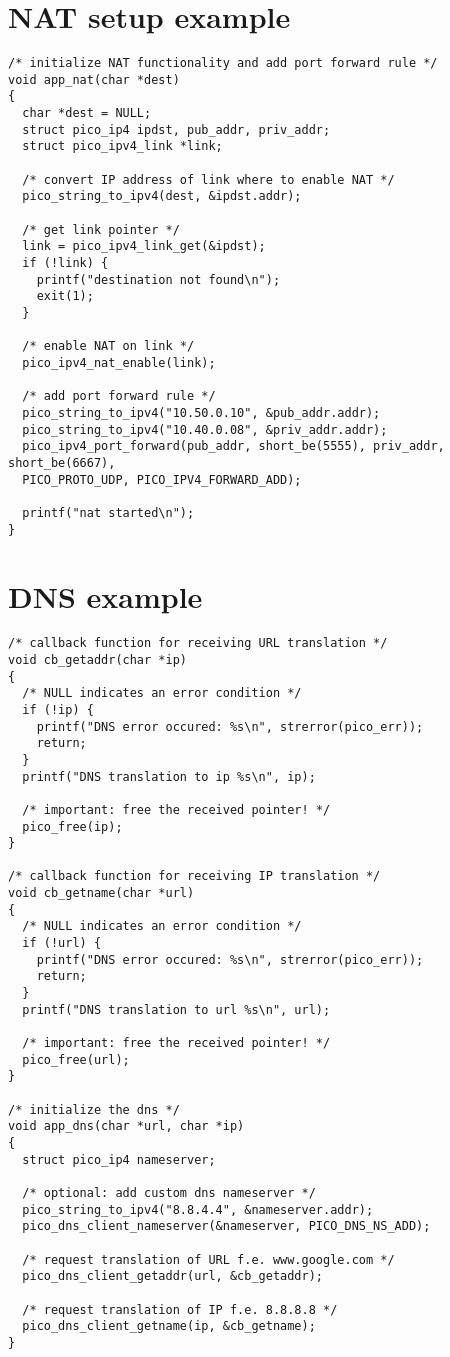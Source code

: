 \section{NAT setup example}

\begin{verbatim}
/* initialize NAT functionality and add port forward rule */
void app_nat(char *dest)
{
  char *dest = NULL;
  struct pico_ip4 ipdst, pub_addr, priv_addr;
  struct pico_ipv4_link *link;

  /* convert IP address of link where to enable NAT */
  pico_string_to_ipv4(dest, &ipdst.addr);
  
  /* get link pointer */
  link = pico_ipv4_link_get(&ipdst);
  if (!link) {
    printf("destination not found\n");
    exit(1);
  }
  
  /* enable NAT on link */
  pico_ipv4_nat_enable(link);
  
  /* add port forward rule */
  pico_string_to_ipv4("10.50.0.10", &pub_addr.addr);
  pico_string_to_ipv4("10.40.0.08", &priv_addr.addr);
  pico_ipv4_port_forward(pub_addr, short_be(5555), priv_addr, short_be(6667),
  PICO_PROTO_UDP, PICO_IPV4_FORWARD_ADD);
  
  printf("nat started\n");
}
\end{verbatim}


\section{DNS example}

\begin{verbatim}
/* callback function for receiving URL translation */
void cb_getaddr(char *ip)
{
  /* NULL indicates an error condition */
  if (!ip) {
    printf("DNS error occured: %s\n", strerror(pico_err));
    return;
  }
  printf("DNS translation to ip %s\n", ip);
  
  /* important: free the received pointer! */
  pico_free(ip);
}

/* callback function for receiving IP translation */
void cb_getname(char *url)
{
  /* NULL indicates an error condition */
  if (!url) {
    printf("DNS error occured: %s\n", strerror(pico_err));
    return;
  }
  printf("DNS translation to url %s\n", url);
  
  /* important: free the received pointer! */
  pico_free(url);
}

/* initialize the dns */
void app_dns(char *url, char *ip)
{
  struct pico_ip4 nameserver;
  
  /* optional: add custom dns nameserver */
  pico_string_to_ipv4("8.8.4.4", &nameserver.addr);
  pico_dns_client_nameserver(&nameserver, PICO_DNS_NS_ADD);

  /* request translation of URL f.e. www.google.com */  
  pico_dns_client_getaddr(url, &cb_getaddr);

  /* request translation of IP f.e. 8.8.8.8 */
  pico_dns_client_getname(ip, &cb_getname);
}
\end{verbatim}